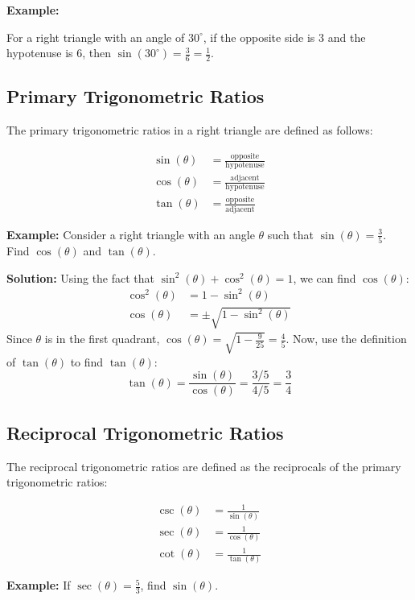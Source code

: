 \documentclass[12pt,a4paper]{article}
\newenvironment{example}
  {\begin{framed}\colorbox{examplecolor}{
  \parbox{\dimexpr\linewidth-2\fboxsep}{
  \textbf{Example:}}}}
  {\end{framed}}
\begin{document}
\begin{example}
For a right triangle with an angle of $30^\circ$, if the opposite side is $3$ and the hypotenuse is $6$, then $\sin(30^\circ) = \frac{3}{6} = \frac{1}{2}$.
\end{example}
\subsection{Primary Trigonometric Ratios}

The primary trigonometric ratios in a right triangle are defined as follows:

\begin{align*}
\sin(\theta) &= \frac{\text{opposite}}{\text{hypotenuse}} \\
\cos(\theta) &= \frac{\text{adjacent}}{\text{hypotenuse}} \\
\tan(\theta) &= \frac{\text{opposite}}{\text{adjacent}}
\end{align*}

\textbf{Example:} Consider a right triangle with an angle $\theta$ such that $\sin(\theta) = \frac{3}{5}$. Find $\cos(\theta)$ and $\tan(\theta)$.

\textbf{Solution:}
Using the fact that $\sin^2(\theta) + \cos^2(\theta) = 1$, we can find $\cos(\theta)$:
\begin{align*}
\cos^2(\theta) &= 1 - \sin^2(\theta) \\
\cos(\theta) &= \pm \sqrt{1 - \sin^2(\theta)}
\end{align*}
Since $\theta$ is in the first quadrant, $\cos(\theta) = \sqrt{1 - \frac{9}{25}} = \frac{4}{5}$.
Now, use the definition of $\tan(\theta)$ to find $\tan(\theta)$:
\[\tan(\theta) = \frac{\sin(\theta)}{\cos(\theta)} = \frac{3/5}{4/5} = \frac{3}{4}\]

\subsection{Reciprocal Trigonometric Ratios}

The reciprocal trigonometric ratios are defined as the reciprocals of the primary trigonometric ratios:

\begin{align*}
\csc(\theta) &= \frac{1}{\sin(\theta)} \\
\sec(\theta) &= \frac{1}{\cos(\theta)} \\
\cot(\theta) &= \frac{1}{\tan(\theta)}
\end{align*}

\textbf{Example:} If $\sec(\theta) = \frac{5}{3}$, find $\sin(\theta)$.
\end{document}
